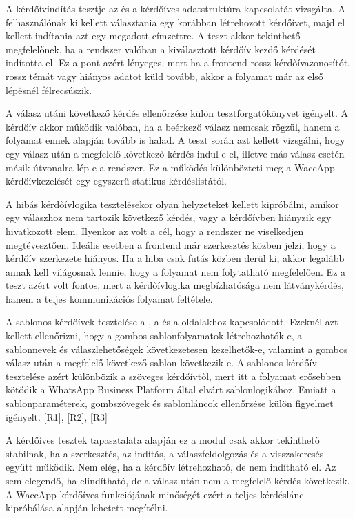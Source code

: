 A kérdőívindítás tesztje az  és a kérdőíves adatstruktúra kapcsolatát vizsgálta. A felhasználónak ki kellett választania egy korábban létrehozott kérdőívet, majd el kellett indítania azt egy megadott címzettre. A teszt akkor tekinthető megfelelőnek, ha a rendszer valóban a kiválasztott kérdőív kezdő kérdését indította el. Ez a pont azért lényeges, mert ha a frontend rossz kérdőívazonosítót, rossz témát vagy hiányos adatot küld tovább, akkor a folyamat már az első lépésnél félrecsúszik.

A válasz utáni következő kérdés ellenőrzése külön tesztforgatókönyvet igényelt. A kérdőív akkor működik valóban, ha a beérkező válasz nemcsak rögzül, hanem a folyamat ennek alapján tovább is halad. A teszt során azt kellett vizsgálni, hogy egy válasz után a megfelelő következő kérdés indul-e el, illetve más válasz esetén másik útvonalra lép-e a rendszer. Ez a működés különbözteti meg a WaccApp kérdőívkezelését egy egyszerű statikus kérdéslistától.

A hibás kérdőívlogika tesztelésekor olyan helyzeteket kellett kipróbálni, amikor egy válaszhoz nem tartozik következő kérdés, vagy a kérdőívben hiányzik egy hivatkozott elem. Ilyenkor az volt a cél, hogy a rendszer ne viselkedjen megtévesztően. Ideális esetben a frontend már szerkesztés közben jelzi, hogy a kérdőív szerkezete hiányos. Ha a hiba csak futás közben derül ki, akkor legalább annak kell világosnak lennie, hogy a folyamat nem folytatható megfelelően. Ez a teszt azért volt fontos, mert a kérdőívlogika megbízhatósága nem látványkérdés, hanem a teljes kommunikációs folyamat feltétele.

A sablonos kérdőívek tesztelése a , a  és a  oldalakhoz kapcsolódott. Ezeknél azt kellett ellenőrizni, hogy a gombos sablonfolyamatok létrehozhatók-e, a sablonnevek és válaszlehetőségek következetesen kezelhetők-e, valamint a gombos válasz után a megfelelő következő sablon következik-e. A sablonos kérdőív tesztelése azért különbözik a szöveges kérdőívtől, mert itt a folyamat erősebben kötődik a WhatsApp Business Platform által elvárt sablonlogikához. Emiatt a sablonparaméterek, gombszövegek és sablonláncok ellenőrzése külön figyelmet igényelt. [R1], [R2], [R3]

A kérdőíves tesztek tapasztalata alapján ez a modul csak akkor tekinthető stabilnak, ha a szerkesztés, az indítás, a válaszfeldolgozás és a visszakeresés együtt működik. Nem elég, ha a kérdőív létrehozható, de nem indítható el. Az sem elegendő, ha elindítható, de a válasz után nem a megfelelő kérdés következik. A WaccApp kérdőíves funkciójának minőségét ezért a teljes kérdéslánc kipróbálása alapján lehetett megítélni.

